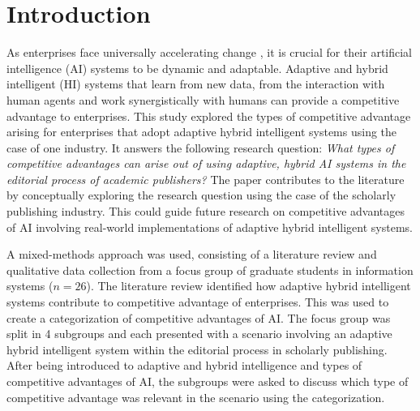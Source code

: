 \section{Introduction}
\label{sec:introduction}

As enterprises face universally accelerating change \citep{eliazarUniversalityAcceleratingChange2018}, it
is crucial for their artificial intelligence (AI) systems to be dynamic and adaptable. Adaptive and hybrid
intelligent (HI) systems that learn from new data, from the interaction with human agents and work
synergistically with humans can provide a competitive advantage to enterprises. This study explored the types
of competitive advantage arising for enterprises that adopt adaptive hybrid intelligent systems using the case
of one industry. It answers the following research question: \textit{What types of competitive advantages can
arise out of using adaptive, hybrid AI systems in the editorial process of academic publishers?} The paper
contributes to the literature by conceptually exploring the research question using the case of the scholarly
publishing industry. This could guide future research on competitive advantages of AI involving real-world
implementations of adaptive hybrid intelligent systems.

A mixed-methods approach was used, consisting of a literature review and qualitative data collection from
a focus group of graduate students in information systems ($n = 26$). The literature review identified how 
adaptive hybrid intelligent systems contribute to competitive advantage of enterprises. This was used to 
create a categorization of competitive advantages of AI. The focus group was split in 4 subgroups and each
presented with a scenario involving an adaptive hybrid intelligent system within the editorial process in
scholarly publishing. After being introduced to adaptive and hybrid intelligence and types of competitive 
advantages of AI, the subgroups were asked to discuss which type of competitive advantage was relevant in
the scenario using the categorization.


